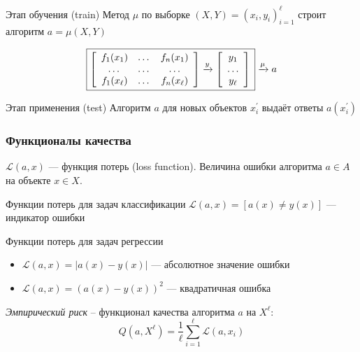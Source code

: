 \documentclass[fullscreen=true, bookmarks=true, hyperref={pdfencoding=unicode}]{beamer}
\begin{document}
\begin{frame}
  \begin{block}{Этап обучения (train)}
    Метод $\mu$ по выборке $(X, Y) = (x_i, y_i)_{i=1}^\ell$ строит алгоритм $a = \mu(X, Y)$

    $$
    \boxed{
    \left[ {\begin{array}{ccc}
       f_1(x_1) & \dots & f_n(x_1) \\
         \dots  & \dots &   \dots  \\
       f_1(x_\ell) & \dots & f_n(x_\ell)
      \end{array} } \right]
    \xrightarrow{y}
    \left[ {\begin{array}{c}
    y_1 \\ \dots \\ y_\ell \end{array} }\right]
    \thinspace}
    \xrightarrow{\mu} a
    $$
  \end{block}

  \begin{block}{Этап применения (test)}
    Алгоритм $a$ для новых объектов $x_i^\prime$ выдаёт ответы $a(x_i^\prime)$
  \end{block}
\end{frame}


\begin{frame}
  \frametitle{Функционалы качества}

  $\mathcal{L}(a, x)$ — функция потерь (loss function). Величина ошибки алгоритма $a \in A$ на объекте $x \in X$.

  \begin{block}{Функции потерь для задач классификации}
    $\mathcal{L}(a, x) = [a(x)\neq y(x)]$  —  индикатор ошибки
  \end{block}

  \begin{block}{Функции потерь для задач регрессии}
    \begin{itemize}
      \item $\mathcal{L}(a, x) = |a(x) - y(x)|$ — абсолютное значение ошибки
      \item $\mathcal{L}(a, x) = (a(x) - y(x))^2$ — квадратичная ошибка
    \end{itemize}

  \end{block}

  \textit{Эмпирический риск} – функционал качества алгоритма $a$ на $X^\ell$:
  $$Q(a, X^\ell) = \frac{1}{\ell} \sum\limits_{i=1}^\ell \mathcal{L}(a, x_i)$$
\end{frame}
\end{document}
